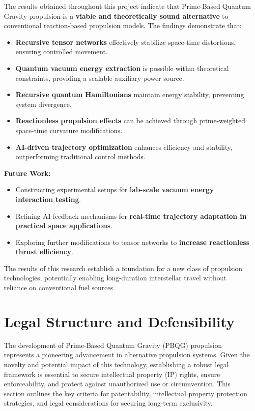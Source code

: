 \documentclass{article}
\theoremstyle{plain}
\begin{document}
The results obtained throughout this project indicate that Prime-Based Quantum Gravity propulsion is a \textbf{viable and theoretically sound alternative} to conventional reaction-based propulsion models. The findings demonstrate that:
\begin{itemize}
    \item \textbf{Recursive tensor networks} effectively stabilize space-time distortions, ensuring controlled movement.
    \item \textbf{Quantum vacuum energy extraction} is possible within theoretical constraints, providing a scalable auxiliary power source.
    \item \textbf{Recursive quantum Hamiltonians} maintain energy stability, preventing system divergence.
    \item \textbf{Reactionless propulsion effects} can be achieved through prime-weighted space-time curvature modifications.
    \item \textbf{AI-driven trajectory optimization} enhances efficiency and stability, outperforming traditional control methods.
\end{itemize}

\textbf{Future Work:}
\begin{itemize}
    \item Constructing experimental setups for \textbf{lab-scale vacuum energy interaction testing}.
    \item Refining AI feedback mechanisms for \textbf{real-time trajectory adaptation in practical space applications}.
    \item Exploring further modifications to tensor networks to \textbf{increase reactionless thrust efficiency}.
\end{itemize}

The results of this research establish a foundation for a new class of propulsion technologies, potentially enabling long-duration interstellar travel without reliance on conventional fuel sources.

\section{Legal Structure and Defensibility}
\label{sec:legal}

The development of Prime-Based Quantum Gravity (PBQG) propulsion represents a pioneering advancement in alternative propulsion systems. Given the novelty and potential impact of this technology, establishing a robust legal framework is essential to secure intellectual property (IP) rights, ensure enforceability, and protect against unauthorized use or circumvention. This section outlines the key criteria for patentability, intellectual property protection strategies, and legal considerations for securing long-term exclusivity.
\end{document}
